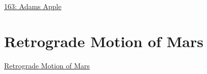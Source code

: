 \documentclass{ximera}
\begin{document}
\begin{onlineOnly}
    \begin{center}
\end{center}
\end{onlineOnly}

\href{https://www.desmos.com/calculator/xvfucsguj9}{163: Adams Apple}



\section{Retrograde Motion of Mars}

\begin{center}
\end{center}

\href{https://www.youtube.com/watch?v=1nVSzzYCAYk}{Retrograde Motion of Mars}
\end{document}
